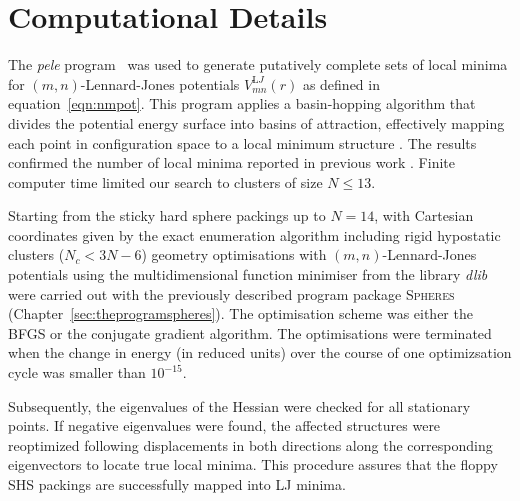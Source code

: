 

\section{Computational Details}

The \textit{pele} program~\autocite{_pelePythonenergy_2017} was used to generate putatively
complete sets of local minima for $(m,n)$-Lennard-Jones potentials 
$V_{mn}^{\mathrm LJ}(r)$ as defined in equation~\eqref{eqn:nmpot}.
This program  applies a basin-hopping algorithm that divides the potential energy
surface into basins of attraction, effectively mapping each point in
configuration space to a local minimum structure
\autocite{Li_MonteCarlominimizationapproach_1987,waless99,Wales_GlobalOptimizationBasinHopping_1997}.  The results confirmed the
number of local minima reported in previous work \autocite{Doye_Saddlepointsdynamics_2002}.
Finite computer time limited our search to clusters of size $N \leq 13$.

Starting from the sticky hard sphere packings up to $N=14$, with Cartesian
coordinates given by the exact enumeration algorithm
\autocite{Hoy_Structurefinitesphere_2012} including rigid hypostatic clusters
($N_c<3N-6$) \autocite{Holmes-Cerfon_EnumeratingRigidSphere_2016} geometry
optimisations with $(m,n)$-Lennard-Jones potentials using the multidimensional
function minimiser from the \Cpp library \textit{dlib}
\autocite{King_DlibmlMachineLearning_2009} were carried out with the previously
described program package \textsc{Spheres}
(Chapter~\ref{sec:theprogramspheres}). The optimisation scheme was either the
\ac{BFGS} or the conjugate gradient algorithm. The optimisations were terminated when the
change in energy (in reduced units) over the course of one optimizsation cycle
was smaller than $10^{-15}$. 

Subsequently, the eigenvalues of the Hessian were checked
for all stationary points. If negative eigenvalues were found, the affected
structures were reoptimized following displacements in both directions along
the corresponding eigenvectors to locate true local minima. This procedure assures
that the floppy \ac{SHS} packings are successfully mapped into LJ minima.

